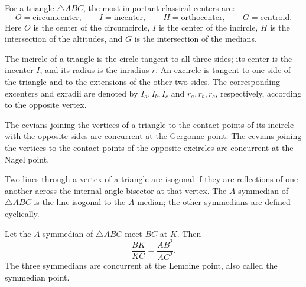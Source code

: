     \begin{definition}
        For a triangle $\triangle ABC$, the most important classical centers
        are:
        \[
            O=\text{circumcenter},
            \qquad
            I=\text{incenter},
            \qquad
            H=\text{orthocenter},
            \qquad
            G=\text{centroid}.
        \]
        Here $O$ is the center of the circumcircle, $I$ is the center of the
        incircle, $H$ is the intersection of the altitudes, and $G$ is the
        intersection of the medians.
    \end{definition}

    \begin{definition}
        The incircle of a triangle is the circle tangent to all three sides; its
        center is the incenter $I$, and its radius is the inradius $r$. An
        excircle is tangent to one side of the triangle and to the extensions of
        the other two sides. The corresponding excenters and exradii are denoted
        by $I_a,I_b,I_c$ and $r_a,r_b,r_c$, respectively, according to the
        opposite vertex.
    \end{definition}

    \begin{theorem}
        The cevians joining the vertices of a triangle to the contact points of
        its incircle with the opposite sides are concurrent at the Gergonne point.
        The cevians joining the vertices to the contact points of the opposite
        excircles are concurrent at the Nagel point.
    \end{theorem}

    \begin{definition}
        Two lines through a vertex of a triangle are isogonal if they are
        reflections of one another across the internal angle bisector at that
        vertex. The $A$-symmedian of $\triangle ABC$ is the line isogonal to the
        $A$-median; the other symmedians are defined cyclically.
    \end{definition}

    \begin{theorem}
        Let the $A$-symmedian of $\triangle ABC$ meet $BC$ at $K$. Then
        \[
            \frac{BK}{KC}=\frac{AB^2}{AC^2}.
        \]
        The three symmedians are concurrent at the Lemoine point, also called
        the symmedian point.
    \end{theorem}

